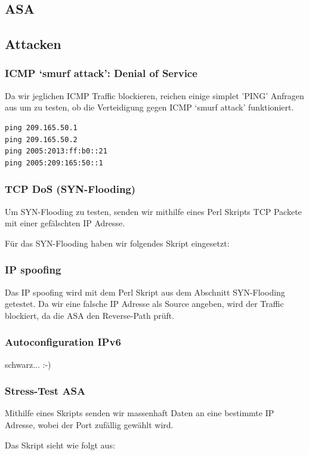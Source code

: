 \documentclass[11pt,a4paper,parskip=half]{scrartcl}
\begin{document}
\subsection{ASA}

\subsection{Attacken}
\subsubsection{ICMP ‘smurf attack’: Denial of Service}
Da wir jeglichen ICMP Traffic blockieren, reichen einige simplet 'PING' Anfragen aus um zu testen, ob die Verteidigung gegen ICMP ‘smurf attack’ funktioniert.
\begin{lstlisting}
ping 209.165.50.1
ping 209.165.50.2
ping 2005:2013:ff:b0::21
ping 2005:209:165:50::1
\end{lstlisting}
\subsubsection{TCP DoS (SYN-Flooding)}
Um SYN-Flooding zu testen, senden wir mithilfe eines Perl Skripts TCP Packete mit einer gefälschten IP Adresse.

Für das SYN-Flooding haben wir folgendes Skript eingesetzt:


\subsubsection{IP spoofing}
Das IP spoofing wird mit dem Perl Skript aus dem Abschnitt SYN-Flooding getestet. Da wir eine falsche IP Adresse als Source angeben, wird der Traffic blockiert, da die ASA den Reverse-Path prüft.
\subsubsection{Autoconfiguration IPv6}
schwarz... :-)

\subsubsection{Stress-Test ASA}
Mithilfe eines Skripts senden wir massenhaft Daten an eine bestimmte IP Adresse, wobei der Port zufällig gewählt wird.

Das Skript sieht wie folgt aus:


\newpage
\appendix
{}
{}
\end{document}
